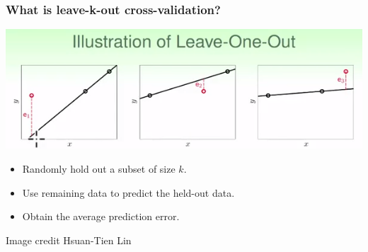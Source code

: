 \documentclass{beamer}
\newcommand{\bX}{\boldsymbol{X}}
\newcommand{\bY}{\boldsymbol{Y}}
\begin{document}
\begin{frame}
\frametitle{What is leave-k-out cross-validation?}
\begin{center}
\includegraphics[scale = 0.5]{loocv_sub.png}
\end{center}
\begin{itemize}
\item Randomly hold out a subset of size $k$.
\item Use remaining data to predict the held-out data.
\item Obtain the average prediction error.
\end{itemize}

{\tiny Image credit Hsuan-Tien Lin}
\end{frame}




\end{document}
